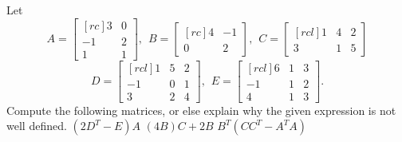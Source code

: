 \ii Let 
\[A = 
\begin{bmatrix}[rc]
3&0\\
-1&2\\
1&1
\end{bmatrix}
, \hspace{5pt} B = 
\begin{bmatrix}[rc]
4&-1\\
0&2
\end{bmatrix}
, \hspace{5pt} C = 
\begin{bmatrix}[rcl]
1&4&2\\
3&1&5
\end{bmatrix}
\]
\[
D = 
\begin{bmatrix}[rcl]
1&5&2\\
-1&0&1\\
3&2&4
\end{bmatrix}
,  \hspace{5pt} E = 
\begin{bmatrix}[rcl]
6&1&3\\
-1&1&2\\
4&1&3
\end{bmatrix}.
\]
Compute the following matrices, or else explain why the given expression is not well defined. 
\bb
\ii $(2D^T-E)A$
\ii $(4B)C+2B$
\ii $B^T(CC^T-A^TA)$
\ee
\ \\
